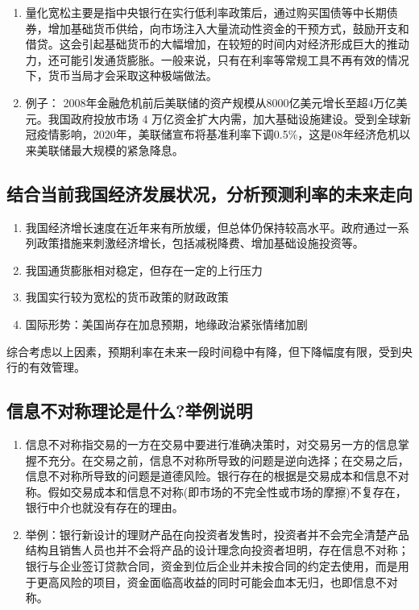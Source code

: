 \documentclass{article}
\begin{document}
\begin{enumerate}
	\item 量化宽松主要是指中央银行在实行低利率政策后，通过购买国债等中长期债券，增加基础货币供给，向市场注入大量流动性资金的干预方式，鼓励开支和借贷。这会引起基础货币的大幅增加，在较短的时间内对经济形成巨大的推动力，还可能引发通货膨胀。一般来说，只有在利率等常规工具不再有效的情况下，货币当局才会采取这种极端做法。
	\item 例子： 2008年金融危机前后美联储的资产规模从8000亿美元增长至超4万亿美元。我国政府投放市场 4 万亿资金扩大内需，加大基础设施建设。受到全球新冠疫情影响，2020年，美联储宣布将基准利率下调0.5\%，这是08年经济危机以来美联储最大规模的紧急降息。
\end{enumerate}

\subsection{结合当前我国经济发展状况，分析预测利率的未来走向}

\begin{enumerate}
	\item 我国经济增长速度在近年来有所放缓，但总体仍保持较高水平。政府通过一系列政策措施来刺激经济增长，包括减税降费、增加基础设施投资等。
	\item 我国通货膨胀相对稳定，但存在一定的上行压力
	\item 我国实行较为宽松的货币政策的财政政策
	\item 国际形势：美国尚存在加息预期，地缘政治紧张情绪加剧
\end{enumerate}

综合考虑以上因素，预期利率在未来一段时间稳中有降，但下降幅度有限，受到央行的有效管理。

\subsection{信息不对称理论是什么?举例说明}

\begin{enumerate}
	\item 信息不对称指交易的一方在交易中要进行准确决策时，对交易另一方的信息掌握不充分。在交易之前，信息不对称所导致的问题是逆向选择；在交易之后，信息不对称所导致的问题是道德风险。银行存在的根据是交易成本和信息不对称。假如交易成本和信息不对称(即市场的不完全性或市场的摩擦)不复存在，银行中介也就没有存在的理由。
	\item 举例：银行新设计的理财产品在向投资者发售时，投资者并不会完全清楚产品结构且销售人员也并不会将产品的设计理念向投资者坦明，存在信息不对称；银行与企业签订贷款合同，资金到位后企业并未按合同的约定去使用，而是用于更高风险的项目，资金面临高收益的同时可能会血本无归，也即信息不对称。
\end{enumerate}
\end{document}

